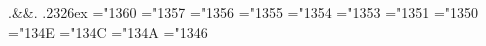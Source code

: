 \atdef@.{\RIfM@&&\else\leavevmode. \fi}
\def\and{\DOTSB\;\mathchar"3026 \;}
\def\implies{\DOTSB\;\Longrightarrow\;}
\def\impliedby{\DOTSB\;\Longleftarrow\;}
\def\frac#1#2{{#1\over#2}}
\def\dfrac#1#2{{\displaystyle{#1\over#2}}}
\def\tfrac#1#2{{\textstyle{#1\over#2}}}
\newdimen\ex@
\ex@.2326ex
\Invalid@\thickness
\def\thickfrac{\relaxnext@
 \DN@{\ifx\next\thickness\let\next@\nextii@\else
 \DN@{\nextii@\thickness1}\fi\next@}%
 \DNii@\thickness##1##2##3{{##2\above##1\ex@##3}}%
 \FN@\next@}
\def\fracwithdelims#1#2#3#4{{#3\overwithdelims#1#2#4}}
\def\thickfracwithdelims#1#2{\relaxnext@\def\ldelim@{#1}\def\rdelim@{#2}%
 \DN@{\ifx\next\thickness\let\next@\nextii@\else
 \DN@{\nextii@\thickness1}\fi\next@}%
 \DNii@\thickness##1##2##3{{##2\abovewithdelims
 \ldelim@\rdelim@##1\ex@##3}}%
 \FN@\next@}
\def\binom#1#2{{#1\choose#2}}
\def\dbinom#1#2{{\displaystyle{#1\choose#2}}}
\def\tbinom#1#2{{\textstyle{#1\choose#2}}}
\def\:{\nobreak\hskip.1111em\mathpunct{}\nonscript\mkern-\thinmuskip{:}\hskip
 .3333emplus.0555em\relax}
\def\snug{\unskip\kern-\mathsurround}
\def\topsmash{\top@true\bot@false\smash@}
\def\botsmash{\top@false\bot@true\smash@}
\newif\iftop@
\newif\ifbot@
\def\smash{\top@true\bot@true\smash@}
\def\smash@{\RIfM@\expandafter\mathpalette\expandafter\mathsm@sh\else
 \expandafter\makesm@sh\fi}
\def\finsm@sh{\iftop@\ht\z@\z@\fi\ifbot@\dp\z@\z@\fi\leavevmode\boxz@}
\def\LimitsOnSums{\global\let\slimits@\displaylimits}
\def\NoLimitsOnSums{\global\let\slimits@\nolimits}
\LimitsOnSums
\mathchardef\coprod@="1360       \def\coprod{\DOTSB\coprod@\slimits@}
\mathchardef\bigvee@="1357       \def\bigvee{\DOTSB\bigvee@\slimits@}
\mathchardef\bigwedge@="1356     \def\bigwedge{\DOTSB\bigwedge@\slimits@}
\mathchardef\biguplus@="1355     \def\biguplus{\DOTSB\biguplus@\slimits@}
\mathchardef\bigcap@="1354       \def\bigcap{\DOTSB\bigcap@\slimits@}
\mathchardef\bigcup@="1353       \def\bigcup{\DOTSB\bigcup@\slimits@}
\mathchardef\prod@="1351         \def\prod{\DOTSB\prod@\slimits@}
\mathchardef\sum@="1350          \def\sum{\DOTSB\sum@\slimits@}
\mathchardef\bigotimes@="134E    \def\bigotimes{\DOTSB\bigotimes@\slimits@}
\mathchardef\bigoplus@="134C     \def\bigoplus{\DOTSB\bigoplus@\slimits@}
\mathchardef\bigodot@="134A      \def\bigodot{\DOTSB\bigodot@\slimits@}
\mathchardef\bigsqcup@="1346     \def\bigsqcup{\DOTSB\bigsqcup@\slimits@}
\def\LimitsOnInts{\global\let\ilimits@\displaylimits}
\def\NoLimitsOnInts{\global\let\ilimits@\nolimits}
\NoLimitsOnInts
\def\int{\DOTSI\intop\ilimits@}
\def\oint{\DOTSI\ointop\ilimits@}
\def\intic@{\mathchoice{\hskip.5em}{\hskip.4em}{\hskip.4em}{\hskip.4em}}
